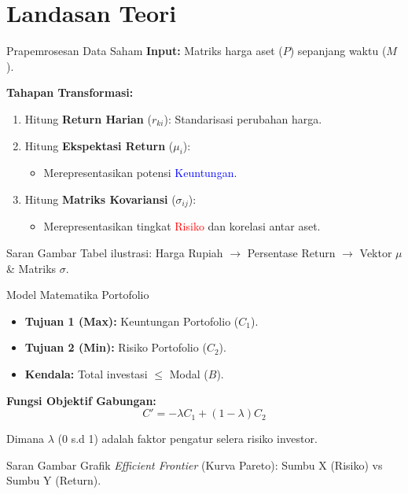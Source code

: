 \documentclass[10pt]{beamer}
\begin{document}
\section{Landasan Teori}
\begin{frame}{Prapemrosesan Data Saham}
    \textbf{Input:} Matriks harga aset ($P$) sepanjang waktu ($M$).
    
    \vspace{0.5cm}
    \textbf{Tahapan Transformasi:}
    \begin{enumerate}
        \item Hitung \textbf{Return Harian} ($r_{ki}$): Standarisasi perubahan harga.
        \item Hitung \textbf{Ekspektasi Return} ($\mu_i$):
        \begin{itemize}
            \item Merepresentasikan potensi \textcolor{blue}{Keuntungan}.
        \end{itemize}
        \item Hitung \textbf{Matriks Kovariansi} ($\sigma_{ij}$):
        \begin{itemize}
            \item Merepresentasikan tingkat \textcolor{red}{Risiko} dan korelasi antar aset.
        \end{itemize}
    \end{enumerate}

    \vspace{0.5cm}
    \begin{block}{Saran Gambar}
        \centering
        Tabel ilustrasi: Harga Rupiah $\rightarrow$ Persentase Return $\rightarrow$ Vektor $\mu$ \& Matriks $\sigma$.
    \end{block}
\end{frame}

\begin{frame}{Model Matematika Portofolio}
    \begin{itemize}
        \item \textbf{Tujuan 1 (Max):} Keuntungan Portofolio ($C_1$).
        \item \textbf{Tujuan 2 (Min):} Risiko Portofolio ($C_2$).
        \item \textbf{Kendala:} Total investasi $\le$ Modal ($B$).
    \end{itemize}
    
    \vspace{0.5cm}
    \textbf{Fungsi Objektif Gabungan:}
    \begin{equation*}
        C' = -\lambda C_1 + (1-\lambda)C_2
    \end{equation*}
    \begin{small}
    Dimana $\lambda$ (0 s.d 1) adalah faktor pengatur selera risiko investor.
    \end{small}

    \vspace{0.5cm}
    \begin{exampleblock}{Saran Gambar}
        \centering
        Grafik \textit{Efficient Frontier} (Kurva Pareto): Sumbu X (Risiko) vs Sumbu Y (Return).
    \end{exampleblock}
\end{frame}
\end{document}
